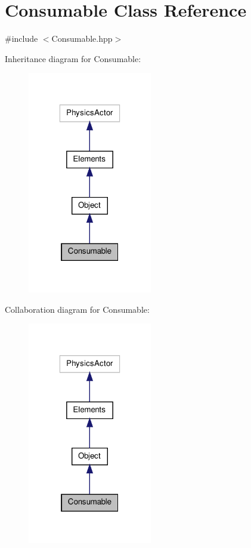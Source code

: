 \hypertarget{class_consumable}{\section{Consumable Class Reference}
\label{class_consumable}
}


{\ttfamily \#include $<$Consumable.\-hpp$>$}



Inheritance diagram for Consumable\-:
\nopagebreak
\begin{figure}[H]
\begin{center}
\leavevmode
\includegraphics[width=154pt]{class_consumable__inherit__graph}
\end{center}
\end{figure}


Collaboration diagram for Consumable\-:
\nopagebreak
\begin{figure}[H]
\begin{center}
\leavevmode
\includegraphics[width=154pt]{class_consumable__coll__graph}
\end{center}
\end{figure}
